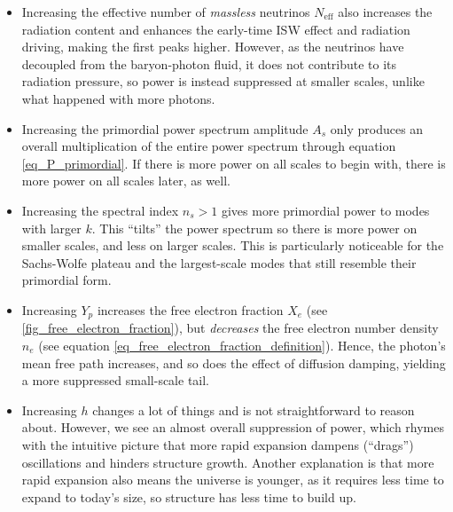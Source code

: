 \documentclass[10pt,a4paper]{article}
\begin{document}
\begin{itemize}
\item
Increasing the effective number of \emph{massless} neutrinos $N_\text{eff}$
also increases the radiation content and enhances the early-time ISW effect and radiation driving,
making the first peaks higher.
However, as the neutrinos have decoupled from the baryon-photon fluid,
it does not contribute to its radiation pressure,
so power is instead suppressed at smaller scales, unlike what happened with more photons.



\item
Increasing the primordial power spectrum amplitude $A_s$
only produces an overall multiplication of the entire power spectrum through equation \eqref{eq_P_primordial}.
If there is more power on all scales to begin with,
there is more power on all scales later, as well.

\item
Increasing the spectral index $n_s>1$ gives more primordial power to modes with larger $k$.
This ``tilts'' the power spectrum so there is more power on smaller scales, and less on larger scales.
This is particularly noticeable for the Sachs-Wolfe plateau and the largest-scale modes that still resemble their primordial form.

\item
Increasing $Y_p$ increases the free electron fraction $X_e$ (see \cref{fig_free_electron_fraction}),
but \emph{decreases} the free electron number density $n_e$ (see equation \eqref{eq_free_electron_fraction_definition}).
Hence, the photon's mean free path increases,
and so does the effect of diffusion damping,
yielding a more suppressed small-scale tail.

\item
Increasing $h$ changes a lot of things and is not straightforward to reason about.
However, we see an almost overall suppression of power,
which rhymes with the intuitive picture that more rapid expansion dampens (``drags'') oscillations and hinders structure growth.
Another explanation is that more rapid expansion also means the universe is younger,
as it requires less time to expand to today's size,
so structure has less time to build up.


\end{itemize}
\end{document}
